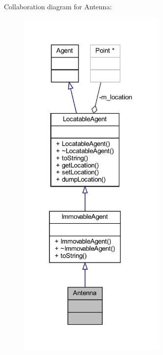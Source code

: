 Collaboration diagram for Antenna\+:\nopagebreak
\begin{figure}[H]
\begin{center}
\leavevmode
\includegraphics[width=208pt]{class_antenna__coll__graph}
\end{center}
\end{figure}
